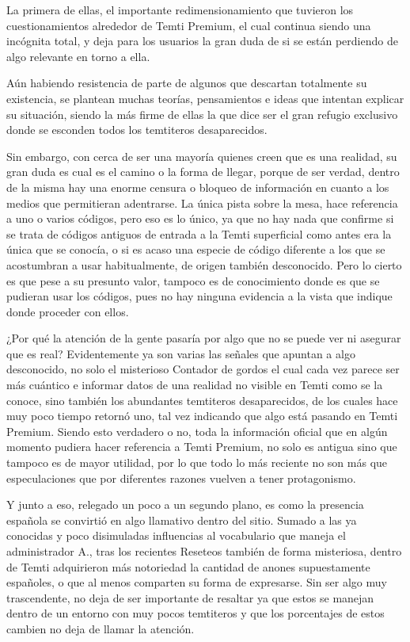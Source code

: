 \documentclass[
  spanish,
]{book}
\begin{document}
La primera de ellas, el importante redimensionamiento que tuvieron los cuestionamientos alrededor de Temti Premium, el cual continua siendo una incógnita total, y deja para los usuarios la gran duda de si se están perdiendo de algo relevante en torno a ella.

Aún habiendo resistencia de parte de algunos que descartan totalmente su existencia, se plantean muchas teorías, pensamientos e ideas que intentan explicar su situación, siendo la más firme de ellas la que dice ser el gran refugio exclusivo donde se esconden todos los temtiteros desaparecidos.

Sin embargo, con cerca de ser una mayoría quienes creen que es una realidad, su gran duda es cual es el camino o la forma de llegar, porque de ser verdad, dentro de la misma hay una enorme censura o bloqueo de información en cuanto a los medios que permitieran adentrarse. La única pista sobre la mesa, hace referencia a uno o varios códigos, pero eso es lo único, ya que no hay nada que confirme si se trata de códigos antiguos de entrada a la Temti superficial como antes era la única que se conocía, o si es acaso una especie de código diferente a los que se acostumbran a usar habitualmente, de origen también desconocido.
Pero lo cierto es que pese a su presunto valor, tampoco es de conocimiento donde es que se pudieran usar los códigos, pues no hay ninguna evidencia a la vista que indique donde proceder con ellos.

¿Por qué la atención de la gente pasaría por algo que no se puede ver ni asegurar que es real?
Evidentemente ya son varias las señales que apuntan a algo desconocido, no solo el misterioso Contador de gordos el cual cada vez parece ser más cuántico e informar datos de una realidad no visible en Temti como se la conoce, sino también los abundantes temtiteros desaparecidos, de los cuales hace muy poco tiempo retornó uno, tal vez indicando que algo está pasando en Temti Premium.
Siendo esto verdadero o no, toda la información oficial que en algún momento pudiera hacer referencia a Temti Premium, no solo es antigua sino que tampoco es de mayor utilidad, por lo que todo lo más reciente no son más que especulaciones que por diferentes razones vuelven a tener protagonismo.

Y junto a eso, relegado un poco a un segundo plano, es como la presencia española se convirtió en algo llamativo dentro del sitio. Sumado a las ya conocidas y poco disimuladas influencias al vocabulario que maneja el administrador A., tras los recientes Reseteos también de forma misteriosa, dentro de Temti adquirieron más notoriedad la cantidad de anones supuestamente españoles, o que al menos comparten su forma de expresarse. Sin ser algo muy trascendente, no deja de ser importante de resaltar ya que estos se manejan dentro de un entorno con muy pocos temtiteros y que los porcentajes de estos cambien no deja de llamar la atención.
\end{document}
